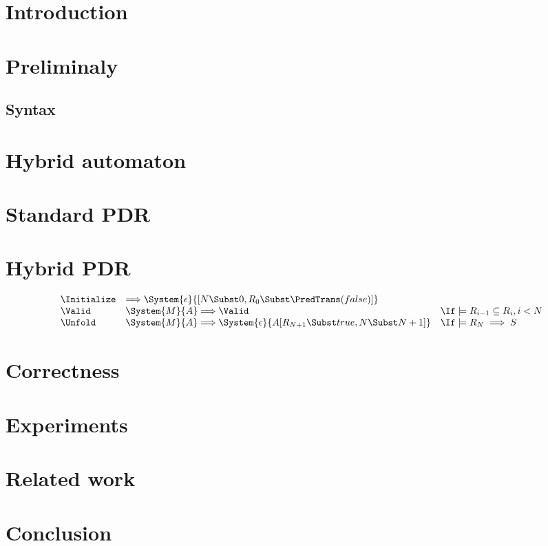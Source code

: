 
\section{Introduction}

\section{Preliminaly}

\subsection{Syntax}

\section{Hybrid automaton}




\section{Standard PDR}

\section{Hybrid PDR}

\begin{align*}
  \begin{array}{lll}
    \Initialize & \Longrightarrow \System{\epsilon}{[N \Subst 0, R_0 \Subst \PredTrans(false)]} &  \\
    \Valid & \System{M}{A} \Longrightarrow \Valid & \If \models R_{i-1} \subseteq R_{i}, i < N \\
    \Unfold & \System{M}{A} \Longrightarrow \System{\epsilon}{A[R_{N+1} \Subst true, N \Subst N+1]} & \If \models R_N \implies S 
  \end{array}
\end{align*}

\section{Correctness}

\section{Experiments}

\section{Related work}

\section{Conclusion}
